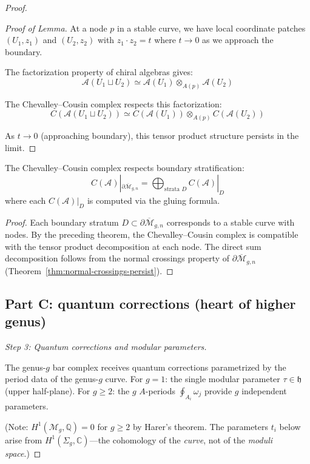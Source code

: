 \begin{proof}
\begin{proof}[Proof of Lemma]
At a node $p$ in a stable curve, we have local coordinate patches $(U_1, z_1)$ and 
$(U_2, z_2)$ with $z_1 \cdot z_2 = t$ where $t \to 0$ as we approach the boundary.

The factorization property of chiral algebras gives:
\[\mathcal{A}(U_1 \sqcup U_2) \simeq \mathcal{A}(U_1) \otimes_{A(p)} \mathcal{A}(U_2)\]

The Chevalley--Cousin complex respects this factorization:
\[C(\mathcal{A}(U_1 \sqcup U_2)) \simeq C(\mathcal{A}(U_1)) \otimes_{A(p)} C(\mathcal{A}(U_2))\]

As $t \to 0$ (approaching boundary), this tensor product structure persists in the limit.
\end{proof}

\begin{corollary}\label{cor:CC-at-boundary}
The Chevalley--Cousin complex respects boundary stratification:
\[C(\mathcal{A})|_{\partial \overline{\mathcal{M}}_{g,n}} = \bigoplus_{\text{strata } D} C(\mathcal{A})|_D\]
where each $C(\mathcal{A})|_D$ is computed via the gluing formula.
\end{corollary}
\begin{proof}
Each boundary stratum $D \subset \partial\overline{\mathcal{M}}_{g,n}$ corresponds to a stable curve with nodes.  By the preceding theorem, the Chevalley--Cousin complex is compatible with the tensor product decomposition at each node.  The direct sum decomposition follows from the normal crossings property of $\partial\overline{\mathcal{M}}_{g,n}$ (Theorem~\ref{thm:normal-crossings-persist}).
\end{proof}

\subsection*{Part C: quantum corrections (heart of higher genus)}

\emph{Step 3: Quantum corrections and modular parameters.}

The genus-$g$ bar complex receives quantum corrections parametrized by the
period data of the genus-$g$ curve. For $g=1$: the single modular parameter $\tau \in \mathfrak{h}$
(upper half-plane). For $g \geq 2$: the $g$ $A$-periods $\oint_{A_i}\omega_j$ provide
$g$ independent parameters.

(Note: $H^1(\mathcal{M}_g, \mathbb{Q}) = 0$ for $g \geq 2$ by Harer's theorem. The
parameters $t_i$ below arise from $H^1(\Sigma_g, \mathbb{C})$---the cohomology of the
\emph{curve}, not of the \emph{moduli space}.)


\end{proof}

